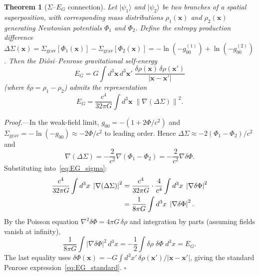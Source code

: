 \documentclass[prl,twocolumn,superscriptaddress,longbibliography,floatfix]{revtex4-2}
\newtheorem{theorem}{Theorem}
\newcommand{\ket}[1]{|#1\rangle}
\newcommand{\abs}[1]{\left|#1\right|}
\newcommand{\norm}[1]{\left\|#1\right\|}
\newcommand{\Sgrav}{\Sigma_{\mathrm{grav}}}
\begin{document}
\begin{theorem}[$\Sigma$--$E_G$ connection]
\label{thm:EG}
Let $\ket{\psi_1}$ and $\ket{\psi_2}$ be two branches of a spatial
superposition, with corresponding mass distributions
$\rho_1(\mathbf{x})$ and $\rho_2(\mathbf{x})$ generating
Newtonian potentials $\Phi_1$ and $\Phi_2$.  Define the entropy
production difference
$\Delta\Sigma(\mathbf{x})
= \Sgrav[\Phi_1(\mathbf{x})] - \Sgrav[\Phi_2(\mathbf{x})]
= -\ln(-g_{00}^{(1)}) + \ln(-g_{00}^{(2)})$.  Then the
Di\'{o}si--Penrose gravitational self-energy~\cite{Diosi1987,Penrose1996}
\begin{equation}
E_G = G\!\int\!d^3\mathbf{x}\,d^3\mathbf{x}'\;
\frac{\delta\rho(\mathbf{x})\,\delta\rho(\mathbf{x}')}
{|\mathbf{x} - \mathbf{x}'|}
\label{eq:EG_standard}
\end{equation}
(where $\delta\rho = \rho_1 - \rho_2$) admits the representation
\begin{equation}
\boxed{
E_G = \frac{c^4}{32\pi G}\int d^3\mathbf{x}\;
\norm{\nabla(\Delta\Sigma)}^2.
}
\label{eq:EG_sigma}
\end{equation}
\end{theorem}

\emph{Proof.}---In the weak-field limit, $g_{00} = -(1 + 2\Phi/c^2)$
and $\Sgrav = -\ln(-g_{00}) \approx -2\Phi/c^2$ to leading order.
Hence $\Delta\Sigma \approx -2(\Phi_1 - \Phi_2)/c^2$ and
\begin{equation}
\nabla(\Delta\Sigma) = -\frac{2}{c^2}\nabla(\Phi_1 - \Phi_2)
= -\frac{2}{c^2}\nabla\delta\Phi.
\label{eq:grad_sigma}
\end{equation}
Substituting into~\eqref{eq:EG_sigma}:
\begin{align}
\frac{c^4}{32\pi G}\int d^3x\;\abs{\nabla(\Delta\Sigma)}^2
&= \frac{c^4}{32\pi G}\cdot\frac{4}{c^4}
\int d^3x\;\abs{\nabla\delta\Phi}^2 \notag \\
&= \frac{1}{8\pi G}\int d^3x\;\abs{\nabla\delta\Phi}^2.
\label{eq:grad_identity}
\end{align}
By the Poisson equation $\nabla^2\delta\Phi = 4\pi G\,\delta\rho$
and integration by parts (assuming fields vanish at infinity),
\begin{equation}
\frac{1}{8\pi G}\int\abs{\nabla\delta\Phi}^2\,d^3x
= -\frac{1}{2}\int\delta\rho\;\delta\Phi\;d^3x = E_G.
\label{eq:poisson}
\end{equation}
The last equality uses
$\delta\Phi(\mathbf{x}) = -G\int d^3x'\,
\delta\rho(\mathbf{x}')/|\mathbf{x}-\mathbf{x}'|$, giving the
standard Penrose expression~\eqref{eq:EG_standard}.
\hfill$\square$
\end{document}
